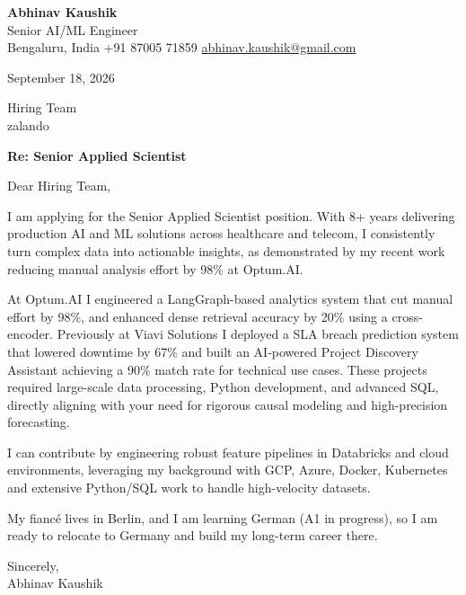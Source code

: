 \documentclass[11pt,a4paper]{article}
\begin{document}
{\Large\bfseries Abhinav Kaushik}\\
Senior AI/ML Engineer\\
Bengaluru, India \textbar{} +91 87005 71859 \textbar{} \href{mailto:abhinav.kaushik@gmail.com}{abhinav.kaushik@gmail.com}

September 18, 2026

Hiring Team\\
zalando

\textbf{Re: Senior Applied Scientist}

Dear Hiring Team,

I am applying for the Senior Applied Scientist position. With 8+ years delivering production AI and ML solutions across healthcare and telecom, I consistently turn complex data into actionable insights, as demonstrated by my recent work reducing manual analysis effort by 98\% at Optum.AI.

At Optum.AI I engineered a LangGraph-based analytics system that cut manual effort by 98\%, and enhanced dense retrieval accuracy by 20\% using a cross-encoder. Previously at Viavi Solutions I deployed a SLA breach prediction system that lowered downtime by 67\% and built an AI-powered Project Discovery Assistant achieving a 90\% match rate for technical use cases. These projects required large-scale data processing, Python development, and advanced SQL, directly aligning with your need for rigorous causal modeling and high-precision forecasting.

I can contribute by engineering robust feature pipelines in Databricks and cloud environments, leveraging my background with GCP, Azure, Docker, Kubernetes and extensive Python/SQL work to handle high-velocity datasets.

My fiancé lives in Berlin, and I am learning German (A1 in progress), so I am ready to relocate to Germany and build my long-term career there.

Sincerely,\\[4pt]
Abhinav Kaushik
\end{document}

